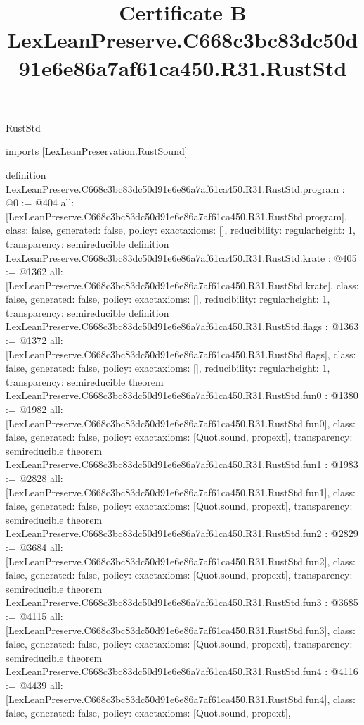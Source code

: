 \begin{lexlean}{RustStd}
\title{Certificate B LexLeanPreserve.C668c3bc83dc50d91e6e86a7af61ca450.R31.RustStd}
\begin{coremodule}
imports [LexLeanPreservation.RustSound]

definition LexLeanPreserve.C668c3bc83dc50d91e6e86a7af61ca450.R31.RustStd.program : @0 := @404 {
  all: [LexLeanPreserve.C668c3bc83dc50d91e6e86a7af61ca450.R31.RustStd.program],
  class: false,
  generated: false,
  policy: exact{axioms: []},
  reducibility: regular{height: 1},
  transparency: semireducible
}
definition LexLeanPreserve.C668c3bc83dc50d91e6e86a7af61ca450.R31.RustStd.krate : @405 := @1362 {
  all: [LexLeanPreserve.C668c3bc83dc50d91e6e86a7af61ca450.R31.RustStd.krate],
  class: false,
  generated: false,
  policy: exact{axioms: []},
  reducibility: regular{height: 1},
  transparency: semireducible
}
definition LexLeanPreserve.C668c3bc83dc50d91e6e86a7af61ca450.R31.RustStd.flags : @1363 := @1372 {
  all: [LexLeanPreserve.C668c3bc83dc50d91e6e86a7af61ca450.R31.RustStd.flags],
  class: false,
  generated: false,
  policy: exact{axioms: []},
  reducibility: regular{height: 1},
  transparency: semireducible
}
theorem LexLeanPreserve.C668c3bc83dc50d91e6e86a7af61ca450.R31.RustStd.fun0 : @1380 := @1982 {
  all: [LexLeanPreserve.C668c3bc83dc50d91e6e86a7af61ca450.R31.RustStd.fun0],
  class: false,
  generated: false,
  policy: exact{axioms: [Quot.sound, propext]},
  transparency: semireducible
}
theorem LexLeanPreserve.C668c3bc83dc50d91e6e86a7af61ca450.R31.RustStd.fun1 : @1983 := @2828 {
  all: [LexLeanPreserve.C668c3bc83dc50d91e6e86a7af61ca450.R31.RustStd.fun1],
  class: false,
  generated: false,
  policy: exact{axioms: [Quot.sound, propext]},
  transparency: semireducible
}
theorem LexLeanPreserve.C668c3bc83dc50d91e6e86a7af61ca450.R31.RustStd.fun2 : @2829 := @3684 {
  all: [LexLeanPreserve.C668c3bc83dc50d91e6e86a7af61ca450.R31.RustStd.fun2],
  class: false,
  generated: false,
  policy: exact{axioms: [Quot.sound, propext]},
  transparency: semireducible
}
theorem LexLeanPreserve.C668c3bc83dc50d91e6e86a7af61ca450.R31.RustStd.fun3 : @3685 := @4115 {
  all: [LexLeanPreserve.C668c3bc83dc50d91e6e86a7af61ca450.R31.RustStd.fun3],
  class: false,
  generated: false,
  policy: exact{axioms: [Quot.sound, propext]},
  transparency: semireducible
}
theorem LexLeanPreserve.C668c3bc83dc50d91e6e86a7af61ca450.R31.RustStd.fun4 : @4116 := @4439 {
  all: [LexLeanPreserve.C668c3bc83dc50d91e6e86a7af61ca450.R31.RustStd.fun4],
  class: false,
  generated: false,
  policy: exact{axioms: [Quot.sound, propext]},
}
\end{coremodule}
\end{lexlean}
